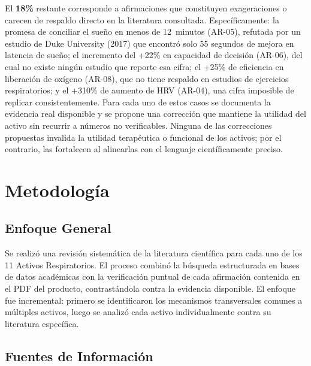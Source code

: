 \documentclass[12pt,a4paper]{article}
\newcommand{\destacado}[1]{\textbf{#1}}
\begin{document}
\vspace{0.2cm}

El \destacado{18\%} restante corresponde a afirmaciones que constituyen
exageraciones o carecen de respaldo directo en la literatura consultada.
Específicamente: la promesa de conciliar el sueño en menos de 12~minutos
(AR-05), refutada por un estudio de Duke University (2017) que encontró solo
55 segundos de mejora en latencia de sueño; el incremento del +22\% en
capacidad de decisión (AR-06), del cual no existe ningún estudio que reporte
esa cifra; el +25\% de eficiencia en liberación de oxígeno (AR-08), que no
tiene respaldo en estudios de ejercicios respiratorios; y el +310\% de aumento
de HRV (AR-04), una cifra imposible de replicar consistentemente. Para cada
uno de estos casos se documenta la evidencia real disponible y se propone una
corrección que mantiene la utilidad del activo sin recurrir a números no
verificables. Ninguna de las correcciones propuestas invalida la utilidad
terapéutica o funcional de los activos; por el contrario, las fortalecen al
alinearlas con el lenguaje científicamente preciso.

\newpage

\section{Metodología}

\subsection{Enfoque General}

Se realizó una revisión sistemática de la literatura científica para cada uno de
los 11 Activos Respiratorios. El proceso combinó la búsqueda estructurada en
bases de datos académicas con la verificación puntual de cada afirmación
contenida en el PDF del producto, contrastándola contra la evidencia disponible.
El enfoque fue incremental: primero se identificaron los mecanismos transversales
comunes a múltiples activos, luego se analizó cada activo individualmente contra
su literatura específica.

\subsection{Fuentes de Información}
\end{document}
